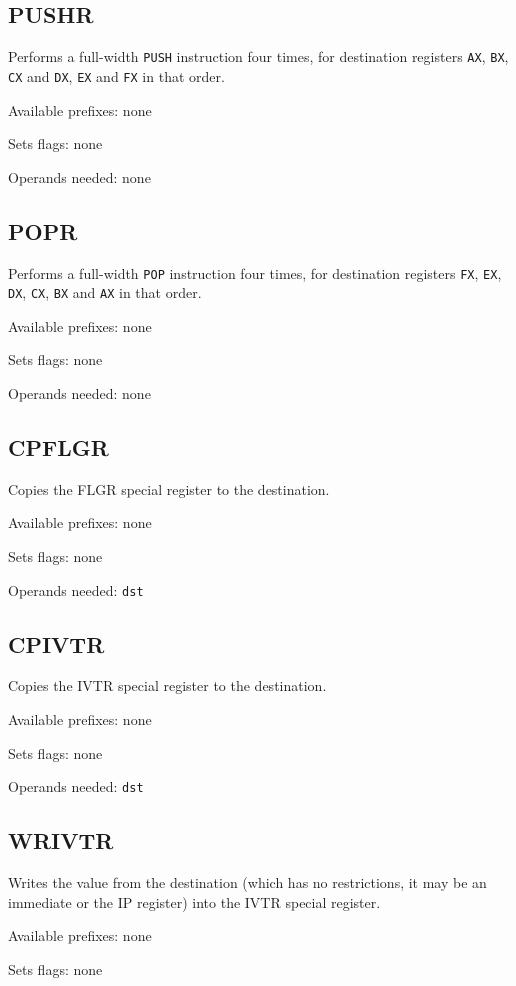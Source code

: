 \documentclass[12pt,a4paper]{report}
\begin{document}
\subsection*{PUSHR}
Performs a full-width \texttt{PUSH} instruction four times, for destination registers \texttt{AX}, \texttt{BX}, \texttt{CX} and \texttt{DX}, \texttt{EX} and \texttt{FX} in that order.

Available prefixes: none

Sets flags: none

Operands needed: none

\subsection*{POPR}
Performs a full-width \texttt{POP} instruction four times, for destination registers \texttt{FX}, \texttt{EX}, \texttt{DX}, \texttt{CX}, \texttt{BX} and \texttt{AX} in that order.

Available prefixes: none

Sets flags: none

Operands needed: none

\subsection*{CPFLGR}
Copies the FLGR special register to the destination.

Available prefixes: none

Sets flags: none

Operands needed: \texttt{dst}

\subsection*{CPIVTR}
Copies the IVTR special register to the destination.

Available prefixes: none

Sets flags: none

Operands needed: \texttt{dst}

\subsection*{WRIVTR}
Writes the value from the destination (which has no restrictions, it may be an immediate or the IP register) into the IVTR special register.

Available prefixes: none

Sets flags: none
\end{document}
